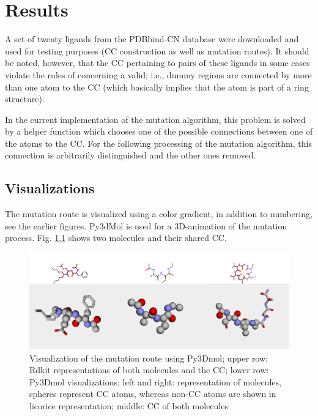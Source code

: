 \chapter{Results}

A set of twenty ligands from the PDBbind-CN database were downloaded and used for testing
purposes (CC construction as well as mutation routes). It
should be noted, however, that the CC pertaining to pairs of these ligands
in some cases violate the rules of {\trafo} concerning a valid; i.e., dummy regions are connected by more
than one atom to the CC (which basically implies that the
atom is part of a ring structure). 

In the current implementation of the mutation algorithm, this problem
is solved by a helper function which chooses one of the possible connections
between one of the atoms to the CC. For the following processing
of the mutation algorithm, this connection is arbitrarily distinguished
and the other ones removed. 


\section{Visualizations}

The mutation route is visualized using a color gradient, in addition
to numbering, see the earlier figures.
Py3dMol is used for a 3D-animation of the mutation process. Fig. \ref{fig:py3dmol} shows two molecules and their shared CC.

\begin{figure}
\includegraphics[scale=0.35]{trafo_py3d_1verkleinert}

\caption{Visualization of the mutation route using Py3Dmol; upper row: Rdkit representations
of both molecules and the CC; lower row: Py3Dmol visualizations;
left and right: representation of molecules, spheres represent CC atoms, whereas non-CC atoms are shown in licorice representation; middle: CC of both molecules}
\label{fig:py3dmol}
\end{figure}



